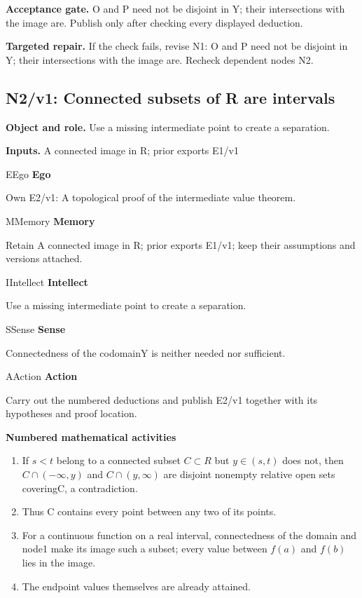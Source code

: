 \documentclass[preprint,12pt,aps,pra,showkeys,amsmath,amssymb,superscriptaddress,floatfix]{revtex4-2}
\theoremstyle{definition}
\theoremstyle{remark}
\newcommand{\mmfaculty}[3]{%
 \begin{mmfacultybox}{#1}{#2}
 {\sffamily\bfseries\color{MMBlue}#2}\par\smallskip #3
 \end{mmfacultybox}}
\newcommand{\field}[2]{\par\smallskip\noindent\textbf{#1.} #2\par}
\begin{document}
\field{Acceptance gate}{O and P need not be disjoint in Y; their intersections with the image
are. Publish only after checking every displayed deduction.}

\field{Targeted repair}{If the check fails, revise N1: O and P need not be disjoint in Y; their
intersections with the image are. Recheck dependent nodes N2.}

\clearpage

\subsection{N2/v1: Connected subsets of R are intervals}

\field{Object and role}{Use a missing intermediate point to create a separation.}

\field{Inputs}{A connected image in R; prior exports E1/v1}

\mmfaculty{E}{Ego}{Own E2/v1: A topological proof of the intermediate value theorem.}

\mmfaculty{M}{Memory}{Retain A connected image in R; prior exports E1/v1; keep their
assumptions and versions attached.}

\mmfaculty{I}{Intellect}{Use a missing intermediate point to create a separation.}

\mmfaculty{S}{Sense}{Connectedness of the codomainY is neither needed nor sufficient.}

\mmfaculty{A}{Action}{Carry out the numbered deductions and publish E2/v1 together with its
hypotheses and proof location.}

\smallskip\noindent\textbf{Numbered mathematical activities}

\begin{enumerate}[label=N2.\arabic*,leftmargin=3.4em]

\item If \(s<t\) belong to a connected subset \(C\subset R\) but
\(y\in (s,t)\) does not, then \(C\cap (-\infty ,y)\) and
\(C\cap (y,\infty )\) are disjoint nonempty relative open sets
coveringC, a contradiction.

\item Thus C contains every point between any two of its points.

\item For a continuous function on a real interval, connectedness of the
domain and node1 make its image such a subset; every value between
\(f(a)\) and \(f(b)\) lies in the image.

\item The endpoint values themselves are already attained.

\end{enumerate}
\end{document}
